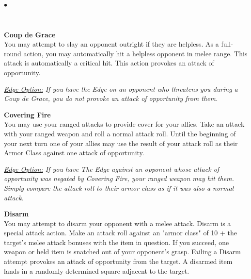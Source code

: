 \begin{list}{$\bullet$}{\itemspace}
	
\\

\hypertarget{combat:coupdegrace}{}
\normalsize\item\textbf{{Coup de Grace}}\\\small
You may attempt to slay an opponent outright if they are helpless. As a full-round action, you may automatically hit a helpless opponent in melee range. This attack is automatically a critical hit. This action provokes an attack of opportunity.


\smallskip\emph{\underline{Edge Option:} If you have the Edge on an opponent who threatens you during a Coup de Grace, you do not provoke an attack of opportunity from them.}\\

\hypertarget{combat:coveringfire}{}
\normalsize\item\textbf{{Covering Fire}}\\\small
You may use your ranged attacks to provide cover for your allies. Take an attack with your ranged weapon and roll a normal attack roll. Until the beginning of your next turn one of your allies may use the result of your attack roll as their Armor Class against one attack of opportunity.

\smallskip\emph{\underline{Edge Option:} If you have The Edge against an opponent whose attack of opportunity was negated by Covering Fire, your ranged weapon may hit them. Simply compare the attack roll to their armor class as if it was also a normal attack.}\\

\hypertarget{combat:disarm}{}
\normalsize\item\textbf{{Disarm}}\\\small
You may attempt to disarm your opponent with a melee attack. Disarm is a special attack action. Make an attack roll against an "armor class" of 10 + the target's melee attack bonuses with the item in question. If you succeed, one weapon or held item is snatched out of your opponent's grasp. Failing a Disarm attempt provokes an attack of opportunity from the target. A disarmed item lands in a randomly determined square adjacent to the target.


\end{list}
